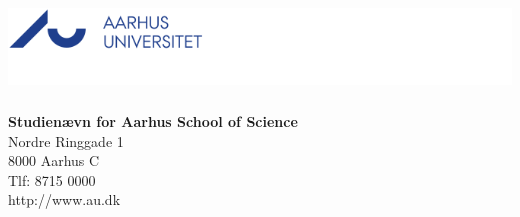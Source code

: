 

{}
\thispagestyle{empty}

\begin{minipage}[t]{0.48\textwidth}
\vspace*{-8pt}			
\includegraphics[height=2.5cm]{billeder/AU-logo-DK}
\end{minipage}
\hfill
\begin{minipage}[t]{0.48\textwidth}
{\small 
\textbf{Studienævn for Aarhus School of Science}\\
Nordre Ringgade 1 \\
8000 Aarhus C \\
Tlf: 8715 0000 \\
http://www.au.dk}
\end{minipage}

\vspace*{1cm}

